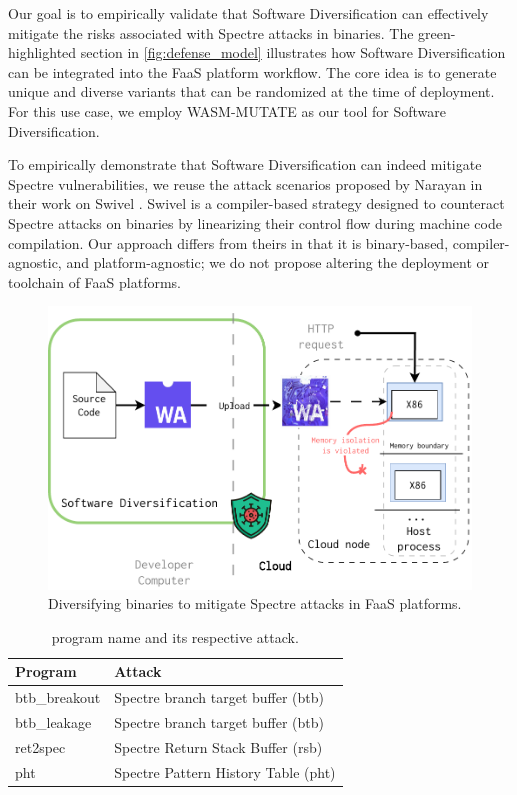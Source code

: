 


Our goal is to empirically validate that Software Diversification can effectively mitigate the risks associated with Spectre attacks in \Wasm binaries. 
The green-highlighted section in \autoref{fig:defense_model} illustrates how Software Diversification can be integrated into the FaaS platform workflow. 
The core idea is to generate unique and diverse \Wasm variants that can be randomized at the time of deployment. 
For this use case, we employ WASM-MUTATE as our tool for Software Diversification.

To empirically demonstrate that Software Diversification can indeed mitigate Spectre vulnerabilities, we reuse the \Wasm attack scenarios proposed by Narayan \etal in their work on Swivel \cite{Swivel}. 
Swivel is a compiler-based strategy designed to counteract Spectre attacks on \Wasm binaries by linearizing their control flow during machine code compilation. 
Our approach differs from theirs in that it is binary-based, compiler-agnostic, and platform-agnostic; we do not propose altering the deployment or toolchain of FaaS platforms. 


\begin{figure}[h]
    \centering
    \includegraphics[width=0.75\linewidth]{figures/edge_protected.pdf}
    \caption{Diversifying \Wasm binaries to mitigate Spectre attacks in FaaS platforms.}
    \label{fig:defense_model}
\end{figure}

\begin{table}
    \centering
    \begin{tabular}{l | l  }
        \hline
         Program &  Attack  \\
        \hline \hline
        btb\_breakout & Spectre branch target buffer (btb)  \\
        \hline
         btb\_leakage & Spectre branch target buffer (btb)  \\
        \hline
         ret2spec &  Spectre Return Stack Buffer (rsb)  \\
        \hline
        pht &  Spectre Pattern History Table (pht)  \\

    \end{tabular}
    \caption{\Wasm program name and its respective attack.}
    \label{programs}
\end{table}

